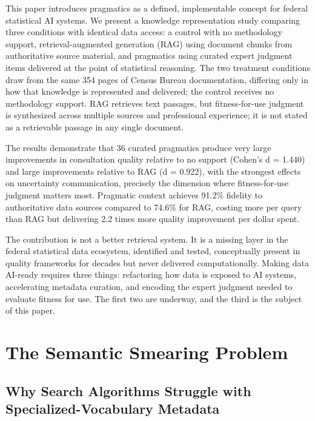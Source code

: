 \documentclass[
  11pt,
  letterpaper,
]{article}
\begin{document}
This paper introduces pragmatics as a defined, implementable concept for
federal statistical AI systems. We present a knowledge representation
study comparing three conditions with identical data access: a control
with no methodology support, retrieval-augmented generation (RAG) using
document chunks from authoritative source material, and pragmatics using
curated expert judgment items delivered at the point of statistical
reasoning. The two treatment conditions draw from the same 354 pages of
Census Bureau documentation, differing only in how that knowledge is
represented and delivered; the control receives no methodology support.
RAG retrieves text passages, but fitness-for-use judgment is synthesized
across multiple sources and professional experience; it is not stated as
a retrievable passage in any single document.

The results demonstrate that 36 curated pragmatics produce very large
improvements in consultation quality relative to no support (Cohen's d =
1.440) and large improvements relative to RAG (d = 0.922), with the
strongest effects on uncertainty communication, precisely the dimension
where fitness-for-use judgment matters most. Pragmatic context achieves
91.2\% fidelity to authoritative data sources compared to 74.6\% for
RAG, costing more per query than RAG but delivering 2.2 times more
quality improvement per dollar spent.

The contribution is not a better retrieval system. It is a missing layer
in the federal statistical data ecosystem, identified and tested,
conceptually present in quality frameworks for decades but never
delivered computationally. Making data AI-ready requires three things:
refactoring how data is exposed to AI systems, accelerating metadata
curation, and encoding the expert judgment needed to evaluate fitness
for use. The first two are underway, and the third is the subject of
this paper.

\section{The Semantic Smearing
Problem}\label{the-semantic-smearing-problem}

\subsection{Why Search Algorithms Struggle with Specialized-Vocabulary
Metadata}\label{why-search-algorithms-struggle-with-specialized-vocabulary-metadata}
\end{document}
